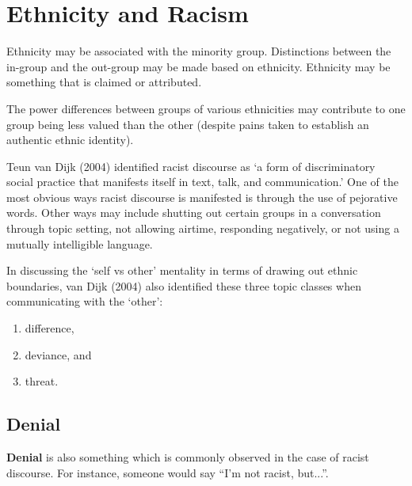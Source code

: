\documentclass[../main.tex]{subfiles}
\begin{document}
    \section{Ethnicity and Racism}
    Ethnicity may be associated with the minority group. Distinctions between the in-group and the out-group may be made based on ethnicity. Ethnicity may be something that is claimed or attributed. \par
    The power differences between groups of various ethnicities may contribute to one group being less valued than the other (despite pains taken to establish an authentic ethnic identity). \par
    Teun van Dijk (2004) identified racist discourse as `a form of discriminatory social practice that manifests itself in text, talk, and communication.' One of the most obvious ways racist discourse is manifested is through the use of pejorative words. Other ways may include shutting out certain groups in a conversation through topic setting, not allowing airtime, responding negatively, or not using a mutually intelligible language. \par
    In discussing the `self vs other' mentality in terms of drawing out ethnic boundaries, van Dijk (2004) also identified these three topic classes when communicating with the `other': \begin{enumerate}
        \item difference,
        \item deviance, and
        \item threat.
    \end{enumerate}
    
    \subsection{Denial}
    \textbf{Denial} is also something which is commonly observed in the case of racist discourse. For instance, someone would say ``I'm not racist, but...''. 
\end{document}
